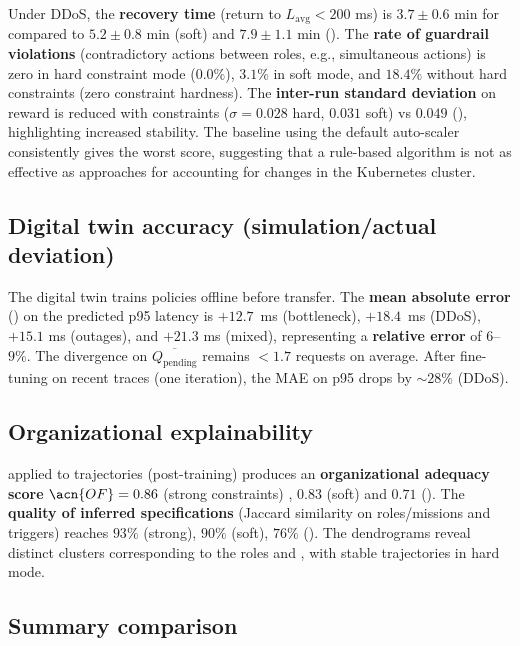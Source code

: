 Under DDoS, the \textbf{recovery time} (return to $L_{\text{avg}}<200$ ms) is $3.7 \pm 0.6$ min for  compared to $5.2 \pm 0.8$ min (soft) and $7.9 \pm 1.1$ min ().
The \textbf{rate of guardrail violations} (contradictory actions between roles, e.g., simultaneous  actions) is zero in hard constraint mode ($0.0\%$), $3.1\%$ in soft mode, and $18.4\%$ without hard constraints (zero constraint hardness).
The \textbf{inter-run standard deviation} on reward is reduced with constraints ($\sigma=0.028$ hard, $0.031$ soft) vs $0.049$ (), highlighting increased stability. The baseline using the default auto-scaler  consistently gives the worst score, suggesting that a rule-based algorithm is not as effective as  approaches for accounting for changes in the Kubernetes cluster.

\subsection* {Digital twin accuracy (simulation/actual deviation)}

The digital twin trains policies offline before transfer.
The \textbf{mean absolute error} () on the predicted p95 latency is $+12.7$~ms (bottleneck), $+18.4$~ms (DDoS), $+15.1$ ms (outages), and $+21.3$ ms (mixed), representing a \textbf{relative error} of $6$–$9\% $.
The divergence on $\overline{Q_{\text{pending}}}$ remains $<1.7$ requests on average.
After fine-tuning on recent traces (one iteration), the MAE on p95 drops by $\sim 28\%$ (DDoS).

\subsection*{Organizational explainability}

 applied to trajectories (post-training) produces an \textbf{organizational adequacy score} $\acn{OF}=0.86$ (strong constraints) , $0.83$ (soft) and $0.71$ ().
The \textbf{quality of inferred specifications} (Jaccard similarity on roles/missions and triggers) reaches $93\%$ (strong), $90\%$ (soft), $76\%$ ().
The dendrograms reveal distinct clusters corresponding to the roles  and , with stable trajectories in hard mode.

\subsection*{Summary comparison}


